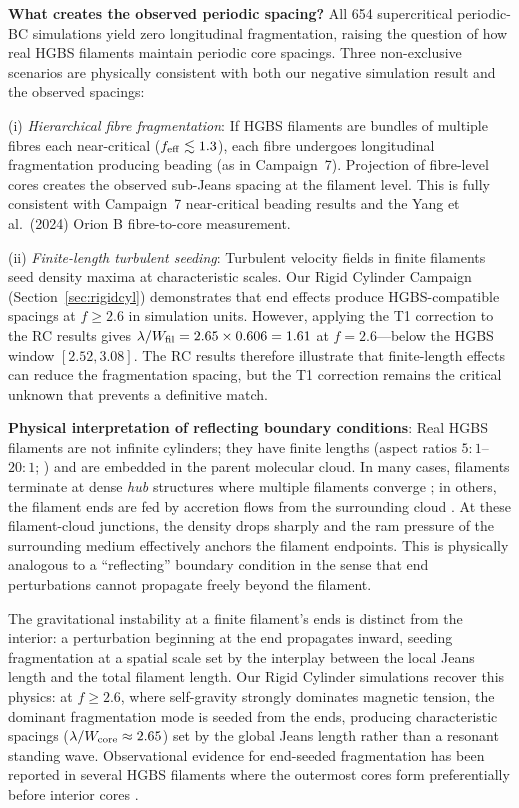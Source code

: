 \documentclass[twoside,twocolumn]{mnras}
\begin{document}
\textbf{What creates the observed periodic spacing?} All 654 supercritical periodic-BC
simulations yield zero longitudinal fragmentation, raising the question of how real HGBS
filaments maintain periodic core spacings. Three non-exclusive scenarios are physically
consistent with both our negative simulation result and the observed spacings:

(i) \textit{Hierarchical fibre fragmentation}: If HGBS filaments are bundles of multiple
fibres each near-critical ($f_{\rm eff} \lesssim 1.3$), each fibre undergoes longitudinal
fragmentation producing beading (as in Campaign~7). Projection of fibre-level cores creates
the observed sub-Jeans spacing at the filament level. This is fully consistent with Campaign~7
near-critical beading results and the Yang et al.\ (2024) Orion B fibre-to-core measurement.

(ii) \textit{Finite-length turbulent seeding}: Turbulent velocity fields in finite
filaments seed density maxima at characteristic scales. Our Rigid Cylinder Campaign
(Section~\ref{sec:rigidcyl}) demonstrates that end effects produce HGBS-compatible spacings
at $f \geq 2.6$ in simulation units. However, applying the T1 correction to the
RC results gives $\lambda/W_{\rm fil} = 2.65 \times 0.606 = 1.61$ at $f = 2.6$---below
the HGBS window $[2.52, 3.08]$. The RC results therefore illustrate that finite-length
effects can reduce the fragmentation spacing, but the T1 correction remains the critical
unknown that prevents a definitive match.

\textbf{Physical interpretation of reflecting boundary conditions}: Real HGBS filaments
are not infinite cylinders; they have finite lengths (aspect ratios $5:1$--$20:1$;
\citealt{Arzoumanian2019}) and are embedded in the parent molecular cloud. In many cases,
filaments terminate at dense \textit{hub} structures where multiple filaments converge
\citep{Andre2010}; in others, the filament ends are fed by accretion flows from the
surrounding cloud \citep{Inutsuka1997, Pineda2023}. At these filament-cloud junctions,
the density drops sharply and the ram pressure of the surrounding medium effectively
anchors the filament endpoints. This is physically analogous to a ``reflecting'' boundary
condition in the sense that end perturbations cannot propagate freely beyond the
filament.

The gravitational instability at a finite filament's ends is distinct from the interior:
a perturbation beginning at the end propagates inward, seeding fragmentation at a spatial
scale set by the interplay between the local Jeans length and the total filament length.
Our Rigid Cylinder simulations recover this physics: at $f \geq 2.6$, where self-gravity
strongly dominates magnetic tension, the dominant fragmentation mode is seeded from the
ends, producing characteristic spacings ($\lambda/W_{\rm core} \approx 2.65$) set by
the global Jeans length rather than a resonant standing wave. Observational evidence
for end-seeded fragmentation has been reported in several HGBS filaments where the
outermost cores form preferentially before interior cores \citep{Pineda2023, Andre2010}.
\end{document}
